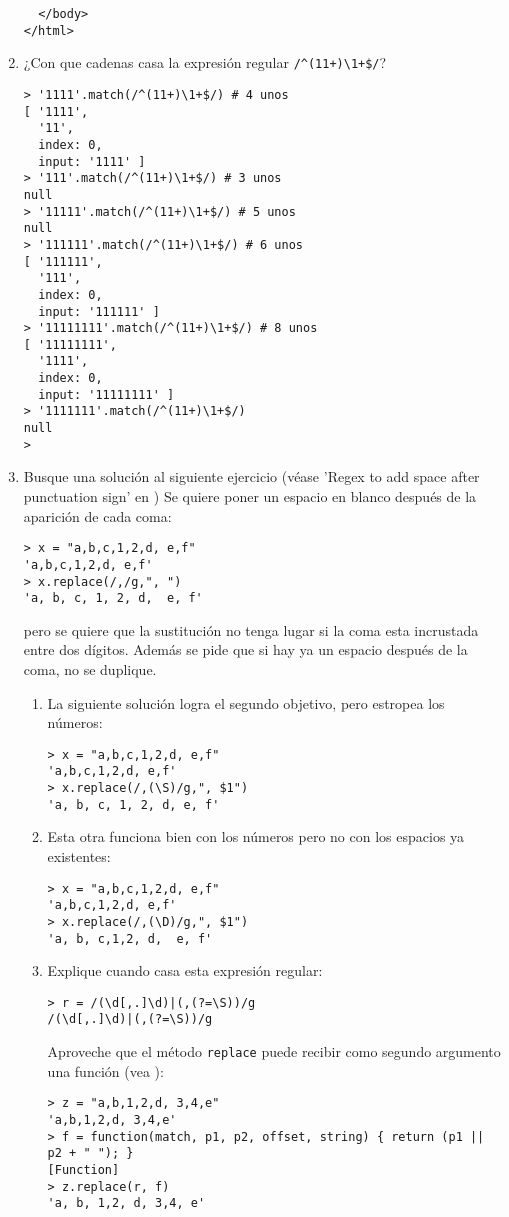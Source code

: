 \begin{enumerate}
\begin{verbatim}
  </body>  
</html>
\end{verbatim}
\item 
¿Con que cadenas casa  la expresión regular \verb|/^(11+)\1+$/|?
\begin{verbatim}
> '1111'.match(/^(11+)\1+$/) # 4 unos
[ '1111',
  '11',
  index: 0,
  input: '1111' ]
> '111'.match(/^(11+)\1+$/) # 3 unos
null
> '11111'.match(/^(11+)\1+$/) # 5 unos
null
> '111111'.match(/^(11+)\1+$/) # 6 unos
[ '111111',
  '111',
  index: 0,
  input: '111111' ]
> '11111111'.match(/^(11+)\1+$/) # 8 unos
[ '11111111',
  '1111',
  index: 0,
  input: '11111111' ]
> '1111111'.match(/^(11+)\1+$/)
null
> 
\end{verbatim}
\item

Busque  una solución al siguiente ejercicio 
(véase 'Regex to add space after punctuation sign' en )
Se quiere poner un espacio en blanco después de la aparición de cada coma:
\begin{verbatim}
> x = "a,b,c,1,2,d, e,f"
'a,b,c,1,2,d, e,f'
> x.replace(/,/g,", ")
'a, b, c, 1, 2, d,  e, f'
\end{verbatim}
pero se quiere que la sustitución no tenga lugar si la coma esta incrustada entre
dos dígitos. Además se pide que si hay ya un espacio después de la coma,
no se duplique.

\begin{enumerate}
\item 
La siguiente solución logra el segundo objetivo, pero estropea los números:
\begin{verbatim}
> x = "a,b,c,1,2,d, e,f"
'a,b,c,1,2,d, e,f'
> x.replace(/,(\S)/g,", $1")
'a, b, c, 1, 2, d, e, f'
\end{verbatim}
\item 
Esta  otra funciona bien con los números pero no con los espacios ya existentes:
\begin{verbatim}
> x = "a,b,c,1,2,d, e,f"
'a,b,c,1,2,d, e,f'
> x.replace(/,(\D)/g,", $1")
'a, b, c,1,2, d,  e, f'
\end{verbatim}
\item 
Explique cuando casa esta expresión regular:
\begin{verbatim}
> r = /(\d[,.]\d)|(,(?=\S))/g
/(\d[,.]\d)|(,(?=\S))/g
\end{verbatim}
Aproveche que el método \verb|replace| puede recibir como segundo argumento
una función (vea ):
\begin{verbatim}
> z = "a,b,1,2,d, 3,4,e"
'a,b,1,2,d, 3,4,e'
> f = function(match, p1, p2, offset, string) { return (p1 || p2 + " "); }
[Function]
> z.replace(r, f)
'a, b, 1,2, d, 3,4, e'
\end{verbatim}
\end{enumerate}
\end{enumerate}

